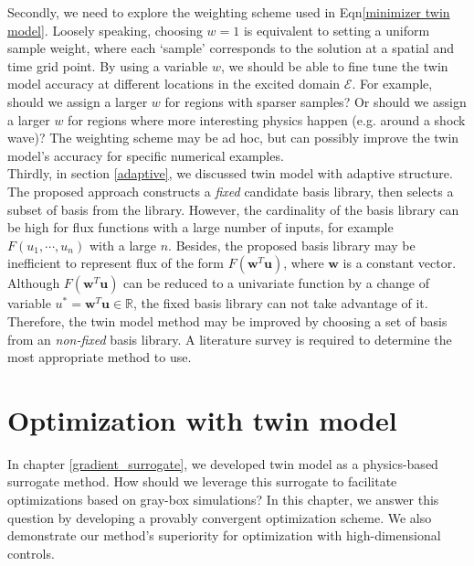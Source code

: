 \documentclass[a4paper,onecolumn]{article}
\theoremstyle{remark}
\begin{document}
\noindent Secondly, we need to explore the weighting scheme used in Eqn\eqref{minimizer twin model}.
Loosely speaking, choosing $w=1$ is equivalent to setting a uniform sample weight, where each `sample'
corresponds to the solution at a spatial and time grid point.
By using a variable $w$, we should be able to fine tune the twin model accuracy at different locations
in the excited domain $\mathcal{E}$. For example, should we assign a larger $w$
for regions with sparser samples? Or should we assign a larger $w$ for regions where
more interesting physics happen (e.g. around a shock wave)?
The weighting scheme may be ad hoc, but can possibly 
improve the twin model's accuracy for specific numerical examples.\\


\noindent Thirdly, in section \ref{adaptive}, we discussed twin model with adaptive structure.
The proposed approach constructs a \emph{fixed} candidate basis library, then selects a subset of basis
from the library.
However, the cardinality of the basis library can be high for flux functions with a large number
of inputs, for example $F(u_1,\cdots,u_n)$ with a large $n$. Besides, the proposed basis
library may be inefficient to represent flux of the form $F(\mathbf{w}^T \mathbf{u})$, where 
$\mathbf{w}$ is
a constant vector. Although $F(\mathbf{w}^T \mathbf{u})$ can be reduced to a univariate
function by a change of variable $u^* = \mathbf{w}^T \mathbf{u} \in\mathbb{R}$, 
the fixed basis library 
can not take advantage of it.
Therefore, the twin model method may be improved by choosing 
a set of basis from an \emph{non-fixed} basis library.
A literature survey is required 
to determine the most appropriate method to use.

\newpage
\section{Optimization with twin model}
\noindent In chapter \ref{gradient_surrogate},
we developed twin model as a physics-based surrogate method.
How should we leverage this surrogate to facilitate optimizations based on gray-box simulations?
In this chapter, we answer this question by developing a provably convergent optimization scheme.
We also demonstrate our method's superiority for optimization with high-dimensional controls.\\
\end{document}
